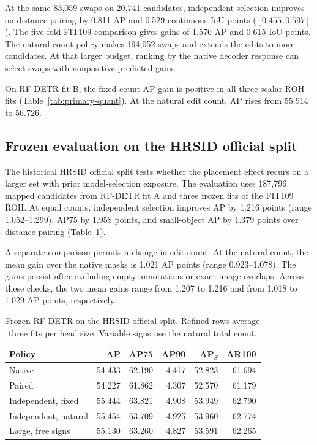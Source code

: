 \documentclass[journal]{IEEEtran}
\begin{document}
At the same 83,059 swaps on 20,741 candidates, independent selection improves on distance pairing by 0.811 AP and 0.529 continuous IoU points (\([0.455,0.597]\)). The five-fold FIT109 comparison gives gains of 1.576 AP and 0.615 IoU points. The natural-count policy makes 194,052 swaps and extends the edits to more candidates. At that larger budget, ranking by the native decoder response can select swaps with nonpositive predicted gains.

On RF-DETR fit B, the fixed-count AP gain is positive in all three scalar ROH fits (Table~\ref{tab:primary-quant}). At the natural edit count, AP rises from 55.914 to 56.726.

\subsection{Frozen evaluation on the HRSID official split}
The historical HRSID official split tests whether the placement effect recurs on a larger set with prior model-selection exposure. The evaluation uses 187,796 mapped candidates from RF-DETR fit A and three frozen fits of the FIT109 ROH. At equal counts, independent selection improves AP by 1.216 points (range 1.052--1.299), AP75 by 1.958 points, and small-object AP by 1.379 points over distance pairing (Table~\ref{tab:official}). 

A separate comparison permits a change in edit count. At the natural count, the mean gain over the native masks is 1.021 AP points (range 0.923--1.078). The gains persist after excluding empty annotations or exact image overlaps. Across these checks, the two mean gains range from 1.207 to 1.216 and from 1.018 to 1.029 AP points, respectively.

\begin{table}[t]
\centering
\caption{Frozen RF-DETR on the HRSID official split. Refined rows average three fits per head size. Variable signs use the natural total count.}
\label{tab:official}
\footnotesize
\setlength{\tabcolsep}{3.5pt}
\begin{tabular}{@{}lrrrrr@{}}
\toprule
Policy & AP & AP75 & AP90 & AP$_{S}$ & AR100\\
\midrule
Native & 54.433 & 62.190 & 4.417 & 52.823 & 61.694\\
Paired & 54.227 & 61.862 & 4.307 & 52.570 & 61.179\\
Independent, fixed & 55.444 & 63.821 & 4.908 & 53.949 & 62.790\\
Independent, natural & 55.454 & 63.709 & 4.925 & 53.960 & 62.774\\
Large, free signs & 55.130 & 63.260 & 4.827 & 53.591 & 62.265\\
\bottomrule
\end{tabular}
\end{table}
\end{document}
